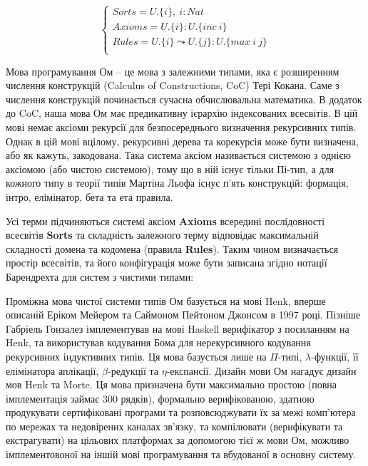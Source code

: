 \begin{equation}
\begin{cases}
Sorts = U.\{i\},\ i : Nat\\
Axioms = U.\{i\} : U.\{inc\ i\}\\
Rules = U.\{i\} \leadsto U.\{j\} : U.\{max\ i\ j\}\\
\end{cases}
\end{equation}

Мова програмування Ом -- це мова з залежними типами, яка є розширенням
числення конструкцій (Calculus of Constructions, CoC) Тері Кокана. Саме з числення
конструкцій починається сучасна обчислювальна математика. В додаток до CoC,
наша мова Ом має предикативну ієрархію індексованих всесвітів. В цій мові немає
аксіоми рекурсії для безпосереднього визначення рекурсивних типів. Однак в цій мові
вцілому, рекурсивні дерева та корекурсія може бути визначена, або як кажуть, закодована.
Така система аксіом називається системою з однією аксіомою (або чистою системою), тому що в ній
існує тільки Пі-тип, а для кожного типу в теорії типів Мартіна Льофа існує п'ять
конструкцій: формація, інтро, елімінатор, бета та ета правила.

Усі терми підчиняються системі аксіом \textbf{Axioms} всередині
послідовності всесвітів \textbf{Sorts} та складність залежного
терму відповідає максимальній складності домена та кодомена
(правила \textbf{Rules}). Таким чином визначається простір всесвітів,
та його конфігурація може бути записана згідно нотації
Барендрехта для систем з чистими типами:

Проміжна мова чистої системи типів Ом базується на мові
Henk\cite{Erik97}, вперше описаній Еріком Мейером та Саймоном Пейтоном Джонсом в 1997 році.
Пізніше Габріель Гонзалез імплементував на мові Haskell
верифікатор з посиланням на Henk, та використував кодування Бома для нерекурсивного
кодування рекурсивних індуктивних типів. Ця мова базується лише на $\Pi$-типі,
$\lambda$-функції, її елімінатора аплікації, $\beta$-редукції та $\eta$-експансії.
Дизайн мови Ом нагадує дизайн мов Henk та Morte.
Ця мова призначена бути максимально простою (повна імплементація займає 300 рядків),
формально верифікованою, здатною продукувати сертифіковані програми та
розповсюджувати їх за межі комп'ютера по мережах та недовірених каналах зв'язку,
та компілювати (верифікувати та екстрагувати) на цільових платформах за допомогою
тієї ж мови Ом, можливо імплементовоної на іншій мові програмування та вбудованої
в основну систему.

